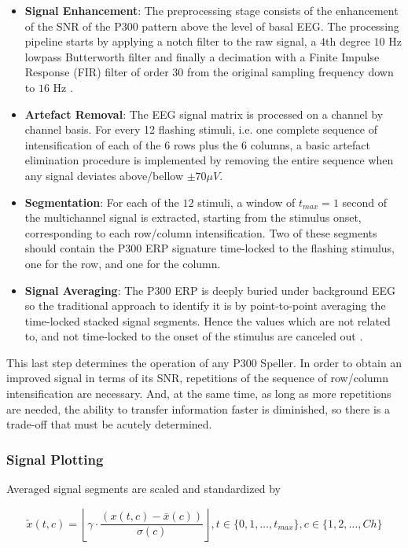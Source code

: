 \documentclass[entropy,article,submit,moreauthors,pdftex,10pt,a4paper]{mdpi}
\begin{document}
\begin{itemize}
\item \textbf{Signal Enhancement}: The preprocessing stage consists of the enhancement of the SNR of the P300 pattern above the level of basal EEG. The processing pipeline starts by applying a notch filter to the raw signal, a 
$4$th degree $10$ Hz lowpass Butterworth filter and finally a decimation with a Finite Impulse Response (FIR) filter of order $30$ from the original sampling frequency down to $16$ Hz \citep{Krusienski2006}.
\item \textbf{Artefact Removal}: The EEG signal matrix is processed on a channel by channel basis.   For every 12 flashing stimuli, i.e. one complete sequence of intensification of each of the $6$ rows plus the $6$ columns, a basic artefact elimination procedure is implemented by removing the entire sequence when any signal deviates above/bellow $ \pm 70 \mu V $.
\item \textbf{Segmentation}: For each of the $12$ stimuli,  a window of $t_{max} = 1$ second of the multichannel signal is extracted, starting from the stimulus onset, corresponding to each row/column intensification.  Two of these segments should contain the P300 ERP signature time-locked to the flashing stimulus, one for the row, and one for the column.
\item \textbf{Signal Averaging}:  The P300 ERP is deeply buried under background EEG so the traditional approach to identify it is by point-to-point averaging the time-locked stacked signal segments.  Hence the values which are not related to, and not time-locked to the onset of the stimulus are canceled out \citep{Liang2008}. 
\end{itemize}

This last step determines the operation of any P300 Speller.  In order to obtain an improved signal in terms of its SNR, repetitions of the sequence of row/column intensification are necessary.  And, at the same time, as long as more repetitions are needed, the ability to transfer information faster is diminished, so there is a trade-off that must be acutely determined.

\subsubsection{Signal Plotting} \label{Plot}

Averaged signal segments are scaled and standardized by 

\begin{equation}
\tilde{x}(t,c) = \left \lfloor{ \gamma \cdot \frac{( x(t,c) - \bar{x}(c)  )}{ \sigma(c) } }\right \rfloor, t \in \{0, 1, \dots, t_{max}\},c \in \{1,2,\dots,Ch\}
\label{eq:standarizedaverages}
\end{equation}
\end{document}

